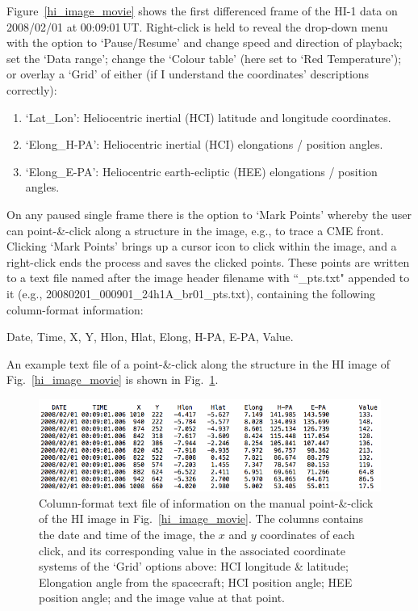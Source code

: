 \documentclass[12pt, a4paper, oneside]{article}
\begin{document}
Figure~\ref{hi_image_movie} shows the first differenced frame of the HI-1 data on 2008/02/01 at 00:09:01\,UT. Right-click is held to reveal the drop-down menu with the option to `Pause/Resume' and change speed and direction of playback; set the `Data range'; change the `Colour table' (here set to `Red Temperature'); or overlay a `Grid' of either (if I understand the coordinates' descriptions correctly):
\begin{enumerate}
\item `Lat\_Lon': Heliocentric inertial (HCI) latitude and longitude coordinates.
\item `Elong\_H-PA': Heliocentric inertial (HCI) elongations / position angles. 
\item `Elong\_E-PA': Heliocentric earth-ecliptic (HEE) elongations / position angles.
\end{enumerate}

On any paused single frame there is the option to `Mark Points' whereby the user can point-\&-click along a structure in the image, e.g., to trace a CME front. Clicking `Mark Points' brings up a cursor icon to click within the image, and a right-click ends the process and saves the clicked points. These points are written to a text file named after the image header filename with ``\_pts.txt" appended to it (e.g., 20080201\_000901\_24h1A\_br01\_pts.txt), containing the following column-format information:

Date, Time, X, Y, Hlon, Hlat, Elong, H-PA, E-PA, Value.

\noindent An example text file of a point-\&-click along the structure in the HI image of Fig.~\ref{hi_image_movie} is shown in Fig.~\ref{textfile}.

\begin{figure}[]
\centering
\includegraphics[width=\linewidth]{../images/textfile.png}
\caption{Column-format text file of information on the manual point-\&-click of the HI image in Fig.~\ref{hi_image_movie}. The columns contains the date and time of the image, the $x$ and $y$ coordinates of each click, and its corresponding value in the associated coordinate systems of the `Grid' options above: HCI longitude \& latitude; Elongation angle from the spacecraft; HCI position angle; HEE position angle; and the image value at that point.}
\label{textfile}
\end{figure}
\end{document}
